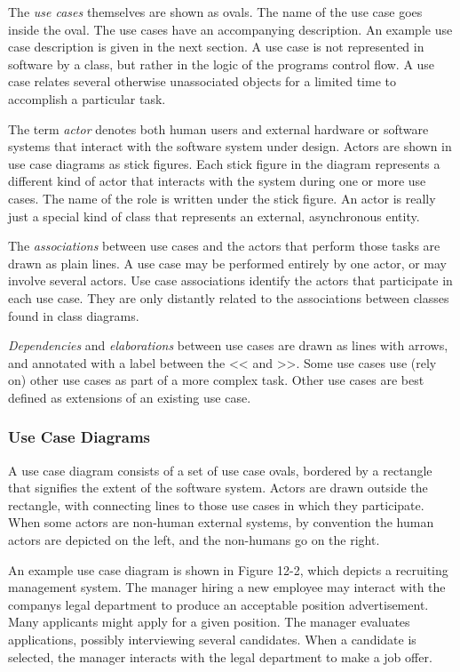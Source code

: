 The \textit{use cases} themselves are shown as ovals. The name of the
use case goes inside the oval. The use cases have an accompanying
description. An example use case description is given in the next
section. A use case is not represented in software by a class, but
rather in the logic of the program{\textquotesingle}s control flow. A
use case relates several otherwise unassociated objects for a limited
time to accomplish a particular task.

The term \textit{actor} denotes both human users and
external hardware or software systems that interact with the software
system under design. Actors are shown in use case diagrams as stick
figures. Each stick figure in the diagram represents a different kind
of actor that interacts with the system during one or more use cases.
The name of the role is written under the stick figure. An
actor is really just a special kind of class that represents an
external, asynchronous entity.

The \textit{association}\textit{s} between use cases
and the actors that perform those tasks are drawn as plain lines. A use
case may be performed entirely by one actor, or may involve several
actors. Use case associations identify the actors that participate in
each use case. They are only distantly related to the associations
between classes found in class diagrams.

\textit{Dependencies} and
\textit{elaboration}\textit{s} between use cases are
drawn as lines with arrows, and annotated with a label between the
{\textless}{\textless} and {\textgreater}{\textgreater}. Some use cases
use (rely on) other use cases as part of a more complex task. Other use
cases are best defined as extensions of an existing use case.

\subsubsection[Use Case Diagrams]{Use Case Diagrams}
A use case diagram consists of a set of use case ovals, bordered by a
rectangle that signifies the extent of the software system. Actors are
drawn outside the rectangle, with connecting lines to those use cases
in which they participate. When some actors are non-human external
systems, by convention the human actors are depicted on the left, and
the non-humans go on the right.

An example use case diagram is shown in Figure 12-2, which depicts a
recruiting management system. The manager hiring a new employee may
interact with the company{\textquotesingle}s legal department to
produce an acceptable position advertisement. Many applicants might
apply for a given position. The manager evaluates applications,
possibly interviewing several candidates. When a candidate is selected,
the manager interacts with the legal department to make a job offer.

